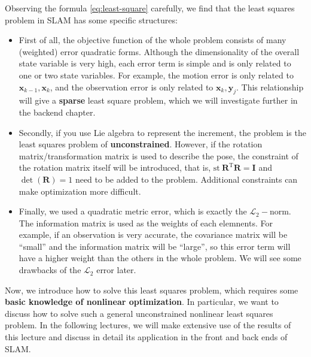 Observing the formula \eqref{eq:least-square} carefully, we find that the least squares problem in SLAM has some specific structures:

\begin{itemize}
	\item First of all, the objective function of the whole problem consists of many (weighted) error quadratic forms. Although the dimensionality of the overall state variable is very high, each error term is simple and is only related to one or two state variables. For example, the motion error is only related to $\bm{x}_{k-1}, \bm{x}_k$, and the observation error is only related to $\bm{x}_k, \bm{y}_j$. This relationship will give a \textbf{sparse} least square problem, which we will investigate further in the backend chapter.

	\item Secondly, if you use Lie algebra to represent the increment, the problem is the least squares problem of \textbf{unconstrained}. However, if the rotation matrix/transformation matrix is ​​used to describe the pose, the constraint of the rotation matrix itself will be introduced, that is, $\mathrm{st}\ \bm{R}^\mathrm{T} \bm{R} = \bm{I}$ and $\det (\bm{R})=1$ need to be added to the problem. Additional constraints can make optimization more difficult. 

	\item Finally, we used a quadratic metric error, which is exactly the $\mathcal{L}_2-$norm. The information matrix is used as the weights of each elemnents. For example, if an observation is very accurate, the covariance matrix will be ``small'' and the information matrix will be ``large'', so this error term will have a higher weight than the others in the whole problem. We will see some drawbacks of the $\mathcal{L}_2$ error later.
\end{itemize}

Now, we introduce how to solve this least squares problem, which requires some \textbf{basic knowledge of nonlinear optimization}. In particular, we want to discuss how to solve such a general unconstrained nonlinear least squares problem. In the following lectures, we will make extensive use of the results of this lecture and discuss in detail its application in the front and back ends of SLAM.

